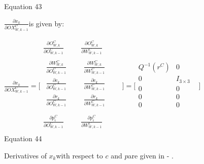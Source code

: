 Equation 43

$\frac{\partial x_{k}}{\partial OX_{W, k-1}^{C}}$is given by:

$\frac{\partial x_{k}}{\partial OX_{W, k-1}^{C}}=\lbrack \begin{matrix}
\frac{\partial O_{W,k}^{C}}{\partial O_{W,k-1}^{C}} & \frac{\partial 
O_{W,k}^{C}}{\partial W_{W,k-1}^{C}} & \\
\begin{matrix}
\frac{\partial W_{W,k}^{C}}{\partial O_{W,k-1}^{C}} & \\
\frac{\partial c_{k}}{\partial O_{W,k-1}^{C}} & \\
\frac{\partial r_{k}}{\partial O_{W,k-1}^{C}} & \\
\end{matrix}
 & \begin{matrix}
\frac{\partial W_{W,k}^{C}}{\partial W_{W,k-1}^{C}} & \\
\frac{\partial c_{k}}{\partial W_{W,k-1}^{C}} & \\
\frac{\partial r_{k}}{\partial W_{W,k-1}^{C}} & \\
\end{matrix}
 & \\
\frac{\partial p_{i}^{C}}{\partial O_{W,k-1}^{C}} & \frac{\partial 
p_{i}^{C}}{\partial W_{W,k-1}^{C}} & \\
\end{matrix}
\rbrack =\lbrack \begin{matrix}
Q^{-1}(r^{C}) & 0 & \\
0 & I_{3\times 3} & \\
0 & 0 & \\
0 & 0 & \\
0 & 0 & \\
\end{matrix}
\rbrack $\\


Equation 44

Derivatives of $x_{k}$with respect to $c$ and $p$are given in - 
. 

